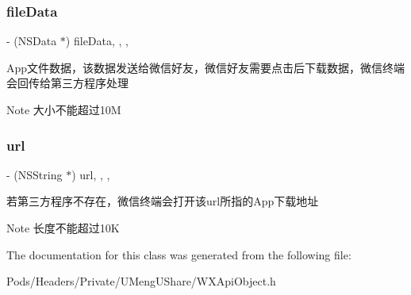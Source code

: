 \subsubsection{\texorpdfstring{file\+Data}{fileData}}
{\footnotesize\ttfamily -\/ (N\+S\+Data $\ast$) file\+Data\hspace{0.3cm}{\ttfamily [read]}, {\ttfamily [write]}, {\ttfamily [nonatomic]}, {\ttfamily [retain]}}

App文件数据，该数据发送给微信好友，微信好友需要点击后下载数据，微信终端会回传给第三方程序处理 \begin{DoxyNote}{Note}
大小不能超过10M 
\end{DoxyNote}
\mbox{\label{interface_w_x_app_extend_object_aa83bdc98798add8efc102fdc45f28964}} 
\subsubsection{\texorpdfstring{url}{url}}
{\footnotesize\ttfamily -\/ (N\+S\+String $\ast$) url\hspace{0.3cm}{\ttfamily [read]}, {\ttfamily [write]}, {\ttfamily [nonatomic]}, {\ttfamily [retain]}}

若第三方程序不存在，微信终端会打开该url所指的\+App下载地址 \begin{DoxyNote}{Note}
长度不能超过10K 
\end{DoxyNote}


The documentation for this class was generated from the following file\+:\begin{DoxyCompactItemize}
\item 
Pods/\+Headers/\+Private/\+U\+Meng\+U\+Share/W\+X\+Api\+Object.\+h\end{DoxyCompactItemize}
